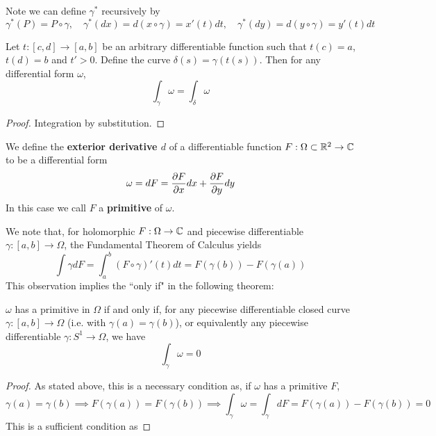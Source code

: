 \documentclass{article}
\begin{document}
Note we can define \(\gamma^*\) recursively by
\begin{equation}
  \gamma^*(P) = P\circ \gamma,
  \quad \gamma^*(dx) = d(x \circ \gamma) = x'(t)dt,
  \quad \gamma^*(dy) = d(y \circ \gamma) = y'(t)dt
\end{equation}

\begin{theorem}
Let \(t: [c, d] \to [a, b]\) be an arbitrary differentiable function such that \(t(c) = a\), \(t(d) = b\) and \(t' > 0\). Define the curve \(\delta(s) = \gamma(t(s))\). Then for any differential form \(\omega\),
\[\int_\gamma\omega = \int_\delta\omega\]
\end{theorem}
\begin{proof}
Integration by substitution.
\end{proof}

\begin{definition}
We define the \textbf{exterior derivative \(d\)} of a differentiable function \(F: \Omega \subset \mathbb{R}^2 \to \mathbb{C}\) to be a differential form
\begin{equation}
  \omega = dF = {\frac{\partial {F}}{\partial {x}}}dx + {\frac{\partial {F}}{\partial {y}}}dy
\end{equation}
In this case we call \(F\) a \textbf{primitive} of \(\omega\).
\end{definition}

We note that, for holomorphic \(F: \Omega \to \mathbb{C}\) and piecewise differentiable \(\gamma: [a, b] \to \Omega\), the Fundamental Theorem of Calculus yields
\begin{equation}
  \int\gamma dF = \int_a^b(F \circ \gamma)'(t)dt = F(\gamma(b)) - F(\gamma(a))
\end{equation}
This observation implies the ``only if" in the following theorem:
\begin{theorem}
\(\omega\) has a primitive in \(\Omega\) if and only if, for any piecewise differentiable closed curve \(\gamma: [a, b] \to \Omega\) (i.e. with \(\gamma(a) = \gamma(b)\)), or equivalently any piecewise differentiable \(\gamma: S^1 \to \Omega\), we have
\begin{equation}
  \int_\gamma\omega = 0
\end{equation}
\end{theorem}
\begin{proof}
As stated above, this is a necessary condition as, if \(\omega\) has a primitive \(F\),
\begin{equation}
  \gamma(a) = \gamma(b) \implies F(\gamma(a)) = F(\gamma(b))
  \implies \int_\gamma\omega = \int_\gamma dF = F(\gamma(a)) - F(\gamma(b)) = 0
\end{equation}
This is a sufficient condition as
\end{proof}
\end{document}
